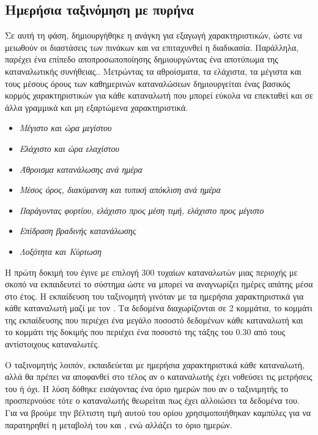 \subsection{Ημερήσια ταξινόμηση με πυρήνα }
Σε αυτή τη φάση, δημιουργήθηκε η ανάγκη για εξαγωγή χαρακτηριστικών, ώστε να μειωθούν οι διαστάσεις των πινάκων και να επιταχυνθεί η διαδικασία. Παράλληλα, παρέχει ένα επίπεδο αποπροσωποποίησης δημιουργώντας ένα αποτύπωμα της καταναλωτικής συνήθειας.\cite{giwrgis}. Μετρώντας τα αθροίσματα, τα ελάχιστα, τα μέγιστα και τους μέσους όρους των καθημερινών καταναλώσεων δημιουργείται ένας βασικός κορμός χαρακτηριστικών για κάθε καταναλωτή που μπορεί εύκολα να επεκταθεί και σε άλλα γραμμικά και μη εξαρτώμενα χαρακτηριστικά.
\begin{itemize}
\item \textit{Μέγιστο και ώρα μεγίστου}
\item \textit{Ελάχιστο και ώρα ελαχίστου}
\item \textit{Άθροισμα κατανάλωσης ανά ημέρα}
\item \textit{Μέσος όρος, διακύμανση και τυπική απόκλιση ανά ημέρα}
\item \textit{Παράγοντας φορτίου, ελάχιστο προς μέση τιμή, ελάχιστο προς μέγιστο}
\item \textit{Επίδραση βραδινής κατανάλωσης}
\item \textit{Λοξότητα και Κύρτωση}
\end{itemize}
Η πρώτη δοκιμή του  έγινε με επιλογή 300 τυχαίων καταναλωτών μιας περιοχής με σκοπό να εκπαιδευτεί το σύστημα ώστε να μπορεί να αναγνωρίζει ημέρες απάτης μέσα στο έτος. Η εκπαίδευση του ταξινομητή γινόταν με τα ημερήσια χαρακτηριστικά για κάθε καταναλωτή μαζί με τον . Τα δεδομένα διαχωρίζονται σε 2 κομμάτια, το κομμάτι της εκπαίδευσης που περιέχει ένα μεγάλο ποσοστό δεδομένων κάθε καταναλωτή και το κομμάτι της δοκιμής που περιέχει ένα ποσοστό της τάξης του $0.30$ από τους αντίστοιχους καταναλωτές.\par
Ο ταξινομητής λοιπόν, εκπαιδεύεται με ημερήσια χαρακτηριστικά κάθε καταναλωτή, αλλά θα πρέπει να αποφανθεί στο τέλος αν ο καταναλωτής έχει νοθεύσει τις μετρήσεις του ή όχι. Η λύση δόθηκε εισάγοντας ένα όριο ημερών που αν ο ταξινιμητής το προσπερνούσε τότε ο καταναλωτής θεωρείται πως έχει αλλοιώσει τα δεδομένα του. Για να βρούμε την βέλτιστη τιμή αυτού του ορίου χρησιμοποιήθηκαν  καμπύλες για να παρατηρηθεί η μεταβολή του  και , ενώ αλλάζει το όριο ημερών.\\
